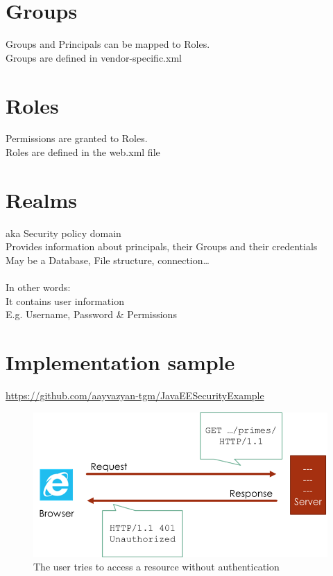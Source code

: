 \documentclass[12pt,a4paper,draft]{report}
\begin{document}
\section{Groups}
Groups and Principals can be mapped to Roles.\\
Groups are defined in vendor-specific.xml\\

\section{Roles}
Permissions are granted to Roles.\\
Roles are defined in the web.xml file\\

\section{Realms}
aka Security policy domain\\
Provides information about principals, their Groups and their credentials\\
May be a Database, File structure, connection…\\\\
In other words:\\
It contains user information\\
E.g. Username, Password \& Permissions\\

\newpage
\section{Implementation sample}
\href{https://github.com/aayvazyan-tgm/JavaEESecurityExample}{https://github.com/aayvazyan-tgm/JavaEESecurityExample}\\
\begin{figure}[h!]
\centering
\includegraphics[width=1\linewidth]{res/Unauthorized}
\caption{The user tries to access a resource without authentication}
\label{fig:Unauthorized}
\end{figure}
\end{document}
